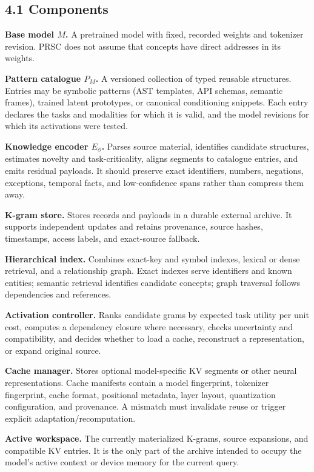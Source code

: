 \documentclass[
  10pt,
]{article}
\begin{document}
\subsection{4.1 Components}\label{components}

\textbf{Base model \(M\).} A pretrained model with fixed, recorded
weights and tokenizer revision. PRSC does not assume that concepts have
direct addresses in its weights.

\textbf{Pattern catalogue \(P_M\).} A versioned collection of typed
reusable structures. Entries may be symbolic patterns (AST templates,
API schemas, semantic frames), trained latent prototypes, or canonical
conditioning snippets. Each entry declares the tasks and modalities for
which it is valid, and the model revisions for which its activations
were tested.

\textbf{Knowledge encoder \(E_\phi\).} Parses source material,
identifies candidate structures, estimates novelty and task-criticality,
aligns segments to catalogue entries, and emits residual payloads. It
should preserve exact identifiers, numbers, negations, exceptions,
temporal facts, and low-confidence spans rather than compress them away.

\textbf{K-gram store.} Stores records and payloads in a durable external
archive. It supports independent updates and retains provenance, source
hashes, timestamps, access labels, and exact-source fallback.

\textbf{Hierarchical index.} Combines exact-key and symbol indexes,
lexical or dense retrieval, and a relationship graph. Exact indexes
serve identifiers and known entities; semantic retrieval identifies
candidate concepts; graph traversal follows dependencies and references.

\textbf{Activation controller.} Ranks candidate grams by expected task
utility per unit cost, computes a dependency closure where necessary,
checks uncertainty and compatibility, and decides whether to load a
cache, reconstruct a representation, or expand original source.

\textbf{Cache manager.} Stores optional model-specific KV segments or
other neural representations. Cache manifests contain a model
fingerprint, tokenizer fingerprint, cache format, positional metadata,
layer layout, quantization configuration, and provenance. A mismatch
must invalidate reuse or trigger explicit adaptation/recomputation.

\textbf{Active workspace.} The currently materialized K-grams, source
expansions, and compatible KV entries. It is the only part of the
archive intended to occupy the model's active context or device memory
for the current query.
\end{document}
